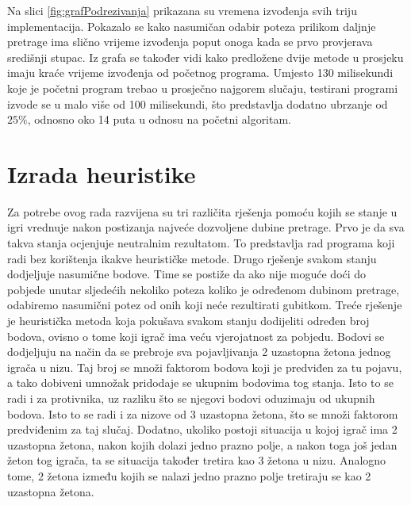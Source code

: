 \documentclass[times, utf8, seminar, numeric, tikz]{fer}
\begin{document}
Na slici \ref{fig:grafPodrezivanja} prikazana su vremena izvođenja svih triju implementacija. Pokazalo se kako nasumičan odabir poteza prilikom daljnje pretrage ima slično vrijeme izvođenja poput onoga kada se prvo provjerava središnji stupac. Iz grafa se također vidi kako predložene dvije metode u prosjeku imaju kraće vrijeme izvođenja od početnog programa. Umjesto 130 milisekundi koje je početni program trebao u prosječno najgorem slučaju, testirani programi izvode se u malo više od 100 milisekundi, što predstavlja dodatno ubrzanje od $25\%$, odnosno oko 14 puta u odnosu na početni algoritam.

\section{Izrada heuristike}
Za potrebe ovog rada razvijena su tri različita rješenja pomoću kojih se stanje u igri vrednuje nakon postizanja najveće dozvoljene dubine pretrage. Prvo je da sva takva stanja ocjenjuje neutralnim rezultatom. To predstavlja rad programa koji radi bez korištenja ikakve heurističke metode. Drugo rješenje svakom stanju dodjeljuje nasumične bodove. Time se postiže da ako nije moguće doći do pobjede unutar sljedećih nekoliko poteza koliko je određenom dubinom pretrage, odabiremo nasumični potez od onih koji neće rezultirati gubitkom. Treće rješenje je heuristička metoda koja pokušava svakom stanju dodijeliti određen broj bodova, ovisno o tome koji igrač ima veću vjerojatnost za pobjedu. Bodovi se dodjeljuju na način da se prebroje sva pojavljivanja 2 uzastopna žetona jednog igrača u nizu. Taj broj se množi faktorom bodova koji je predviđen za tu pojavu, a tako dobiveni umnožak pridodaje se ukupnim bodovima tog stanja. Isto to se radi i za protivnika, uz razliku što se njegovi bodovi oduzimaju od ukupnih bodova. Isto to se radi i za nizove od 3 uzastopna žetona, što se množi faktorom predviđenim za taj slučaj. Dodatno, ukoliko postoji situacija u kojoj igrač ima 2 uzastopna žetona, nakon kojih dolazi jedno prazno polje, a nakon toga još jedan žeton tog igrača, ta se situacija također tretira kao 3 žetona u nizu. Analogno tome, 2 žetona između kojih se nalazi jedno prazno polje tretiraju se kao 2 uzastopna žetona.\\
\end{document}
